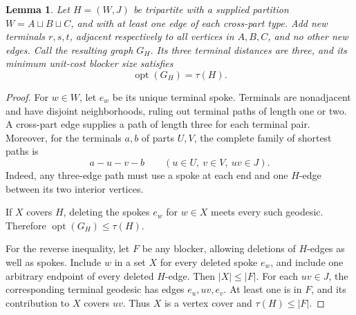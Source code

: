 \documentclass[11pt]{article}
\newtheorem{lemma}[theorem]{Lemma}
\newcommand{\opt}{\operatorname{opt}}
\begin{document}
\begin{lemma}\label{lem:spokes}
Let $H=(W,J)$ be tripartite with a supplied partition $W=A\sqcup B\sqcup C$,
and with at least one edge of each cross-part type. Add new terminals $r,s,t$,
adjacent respectively to all vertices in $A,B,C$, and no other new edges.
Call the resulting graph $G_H$. Its three terminal distances are three, and
its minimum unit-cost blocker size satisfies
\[
\opt(G_H)=\tau(H).
\]
\end{lemma}
\begin{proof}
For $w\in W$, let $e_w$ be its unique terminal spoke. Terminals are nonadjacent
and have disjoint neighborhoods, ruling out terminal paths of length one or
two. A cross-part edge supplies a path of length three for each terminal pair.
Moreover, for the terminals $a,b$ of parts $U,V$, the complete family of
shortest paths is
\[
a-u-v-b\qquad (u\in U,\ v\in V,\ uv\in J).
\]
Indeed, any three-edge path must use a spoke at each end and one $H$-edge
between its two interior vertices.

If $X$ covers $H$, deleting the spokes $e_w$ for $w\in X$ meets every such
geodesic. Therefore $\opt(G_H)\le\tau(H)$.

For the reverse inequality, let $F$ be any blocker, allowing deletions of
$H$-edges as well as spokes. Include $w$ in a set $X$ for every deleted spoke
$e_w$, and include one arbitrary endpoint of every deleted $H$-edge. Then
$|X|\le |F|$. For each $uv\in J$, the corresponding terminal geodesic has
edges $e_u,uv,e_v$. At least one is in $F$, and its contribution to $X$
covers $uv$. Thus $X$ is a vertex cover and $\tau(H)\le |F|$.
\end{proof}
\end{document}
